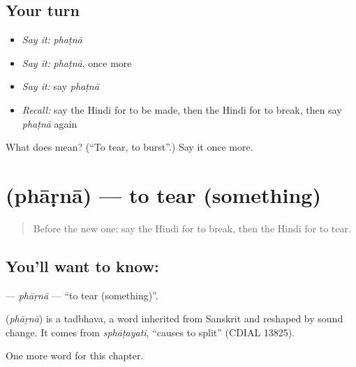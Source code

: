 \subsection*{Your turn}
\begin{itemize}
\raggedright
  \item \emph{Say it:} \emph{phaṭnā}
  \item \emph{Say it:} \emph{phaṭnā}, once more
  \item \emph{Say it:} say \emph{phaṭnā}
  \item \emph{Recall:} say the Hindi for to be made, then the Hindi for to break, then say \emph{phaṭnā} again
\end{itemize}

\begin{tcolorbox}[breakable,colback=teal!4,colframe=teal!35!black,title={Before you move on}]
What does  mean? (\textquotedblleft{}To tear, to burst\textquotedblright{}.) Say it once more.
\end{tcolorbox}
\section[\texorpdfstring{\hi{फाड़ना} (phāṛnā)}{फाड़ना (phāṛnā)}]{ (phāṛnā) — to tear (something)}

\label{lesson:HI-C227-pharna}



\begin{quote}
Before the new one: say the Hindi for to break, then the Hindi for to tear.
\end{quote}

\subsection*{You'll want to know: }
\textbf{} — \emph{phāṛnā} — \textquotedblleft{}to tear (something)\textquotedblright{}.

\begin{cousinweb}
\textbf{} (\emph{phāṛnā}) is a tadbhava, a word inherited from Sanskrit and reshaped by sound change. It comes from \emph{sphāṭayati}, \textquotedblleft{}causes to split\textquotedblright{} (CDIAL 13825).
\end{cousinweb}

\begin{grammarlens}[title={What you've built}]
One more word for this chapter.
\end{grammarlens}

